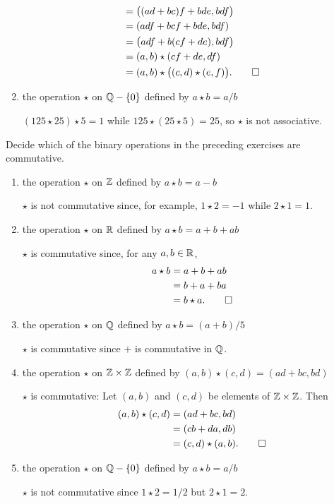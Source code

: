 \begin{enumerate}
\begin{solution}
\begin{align*}
      &= \big((ad+bc)f+bde, bdf\big) \\
      &= (adf+bcf+bde, bdf) \\
      &= \big(adf+b(cf+de), bdf\big) \\
      &= (a,b)\star(cf+de,df) \\
      &= (a,b)\star\big((c,d)\star(e,f)\big). \qedhere
    \end{align*}
  \end{solution}
\item the operation $\star$ on $\mathbb{Q} - \{0\}$ defined by
  $a\star b = a/b$
  \begin{solution}
    $(125\star25)\star5 = 1$ while $125\star(25\star5) = 25$, so
    $\star$ is not associative.
  \end{solution}
\end{enumerate}

 Decide which of the binary operations in the preceding
exercises are commutative.
\begin{enumerate}
\item the operation $\star$ on $\mathbb{Z}$ defined by $a\star b = a - b$
  \begin{solution}
    $\star$ is not commutative since, for example, $1\star2 = -1$
    while $2\star1 = 1$.
  \end{solution}
\item the operation $\star$ on $\mathbb{R}$ defined by $a\star b = a + b + ab$
  \begin{solution}
    $\star$ is commutative since, for any $a,b\in\mathbb{R}$,
    \begin{align*}
      a\star b &= a + b + ab \\
               &= b + a + ba \\
               &= b\star a. \qedhere
    \end{align*}
  \end{solution}
\item the operation $\star$ on $\mathbb{Q}$ defined by $a\star b = (a + b)/5$
  \begin{solution}
    $\star$ is commutative since $+$ is commutative in $\mathbb{Q}$.
  \end{solution}
\item the operation $\star$ on $\mathbb{Z}\times\mathbb{Z}$ defined by
  $(a,b)\star(c,d) = (ad + bc, bd)$
  \begin{solution}
    $\star$ is commutative: Let $(a,b)$ and $(c,d)$ be elements of
    $\mathbb{Z}\times\mathbb{Z}$. Then
    \begin{align*}
      (a,b)\star(c,d) &= (ad + bc, bd) \\
                      &= (cb + da, db) \\
                      &= (c,d)\star(a,b). \qedhere
    \end{align*}
  \end{solution}
\item the operation $\star$ on $\mathbb{Q} - \{0\}$ defined by
  $a\star b = a/b$
  \begin{solution}
    $\star$ is not commutative since $1\star2 = 1/2$ but
    $2\star1 = 2$.
  \end{solution}
\end{enumerate}

